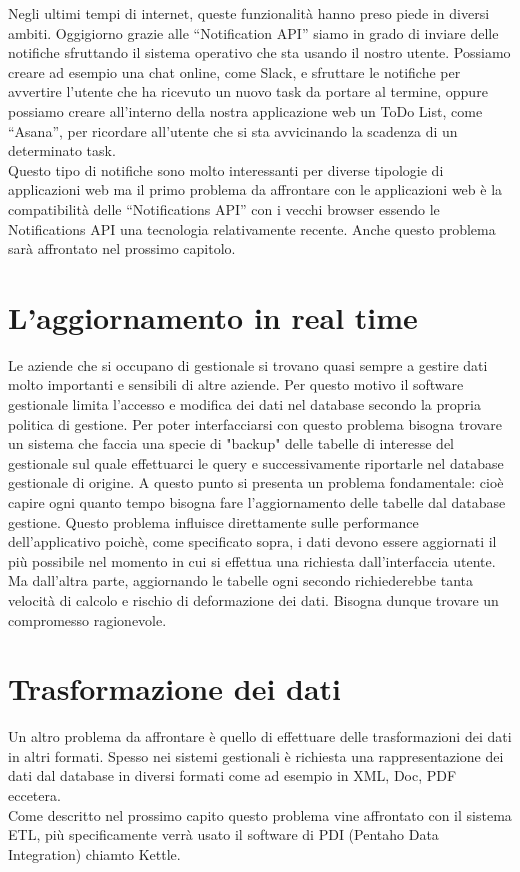 Negli ultimi tempi di internet, queste funzionalità hanno preso piede in diversi ambiti. Oggigiorno grazie alle “Notification API” siamo in grado di inviare delle notifiche sfruttando il sistema operativo che sta usando il nostro utente. Possiamo creare ad esempio una chat online, come Slack, e sfruttare le notifiche per avvertire l'utente che ha ricevuto un nuovo task da portare al termine, oppure possiamo creare all'interno della nostra applicazione web un ToDo List, come “Asana”, per ricordare all'utente che si sta avvicinando la scadenza di un determinato task.\\
Questo tipo di notifiche sono molto interessanti per diverse tipologie di applicazioni web ma il primo problema da affrontare con le applicazioni web è la compatibilità delle “Notifications API”  con i vecchi  browser essendo le Notifications API una tecnologia relativamente recente. Anche questo problema sarà affrontato nel prossimo capitolo.


\section{L'aggiornamento in real time}
Le aziende che si occupano di gestionale si trovano quasi sempre a gestire dati molto importanti e sensibili di altre aziende. Per questo motivo il software gestionale limita l'accesso e modifica dei dati nel database secondo la propria politica di gestione. Per poter interfacciarsi con questo problema bisogna trovare un sistema che faccia una specie di "backup" delle tabelle di interesse del gestionale sul quale effettuarci le query e successivamente riportarle nel database gestionale di origine. A questo punto si presenta un problema fondamentale: cioè capire ogni quanto tempo bisogna fare l'aggiornamento delle tabelle dal database gestione. Questo problema influisce direttamente sulle performance dell'applicativo poichè, come specificato sopra, i dati devono essere aggiornati il più possibile nel momento in cui si effettua una richiesta dall'interfaccia utente. Ma dall'altra parte, aggiornando le tabelle ogni secondo richiederebbe tanta velocità di calcolo e rischio di deformazione dei dati. Bisogna dunque trovare un compromesso ragionevole. 

\section{Trasformazione dei dati}
Un altro problema da affrontare è quello di effettuare delle trasformazioni dei dati in altri formati. Spesso nei sistemi gestionali è richiesta una rappresentazione dei dati dal database in diversi formati come ad esempio in XML, Doc, PDF eccetera.  \\
Come descritto nel prossimo capito questo problema vine affrontato con il sistema ETL, più specificamente verrà usato il software di PDI (Pentaho Data Integration) chiamto Kettle.






